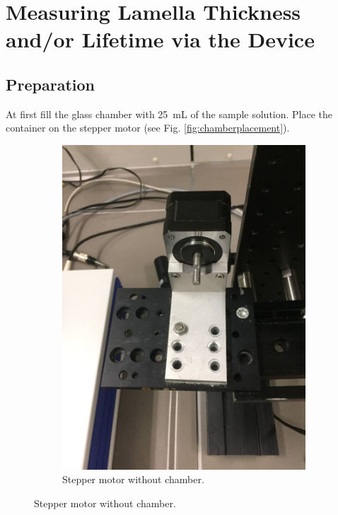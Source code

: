 
	\chapter{Measuring Lamella Thickness and/or Lifetime via the Device}
		
	\section{Preparation}
	At first fill the glass chamber with \SI{25}{\milli\liter} of the sample solution. 
	Place the container on the stepper motor (see Fig. \ref{fig:chamberplacement}). 
	
	
	\begin{figure}
		\centering
		\begin{subfigure}[b]{0.4\textwidth}
			\includegraphics[width=\textwidth]{LamellaDevice_Hardware/PictureWithoutChamber}
			\caption{Stepper motor without chamber.}
		\end{subfigure} \hspace{0.1\textwidth}

\end{figure}
